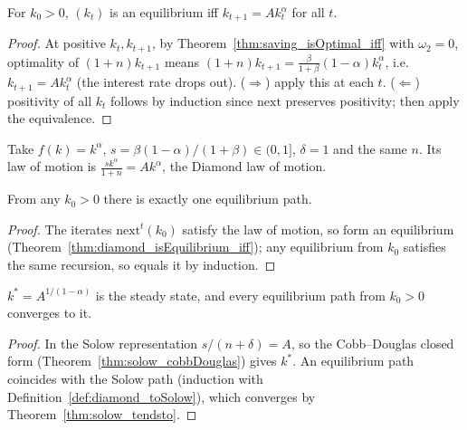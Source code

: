 \begin{theorem}
\label{thm:diamond_isEquilibrium_iff}
\leanok
{}
For $k_0 > 0$, $(k_t)$ is an equilibrium iff $k_{t+1} = A k_t^\alpha$ for all $t$.
\end{theorem}
\begin{proof}
\leanok
At positive $k_t, k_{t+1}$, by Theorem~\ref{thm:saving_isOptimal_iff} with $\omega_2 = 0$, optimality of
$(1+n)k_{t+1}$ means $(1+n)k_{t+1} = \frac{\beta}{1+\beta}(1-\alpha)k_t^\alpha$, i.e.\ $k_{t+1} = A k_t^\alpha$
(the interest rate drops out). ($\Rightarrow$) apply this at each $t$. ($\Leftarrow$) positivity of all $k_t$
follows by induction since $\mathrm{next}$ preserves positivity; then apply the equivalence.
\end{proof}

\begin{definition}
\label{def:diamond_toSolow}
\leanok
{}
Take $f(k) = k^\alpha$, $s = \beta(1-\alpha)/(1+\beta) \in (0, 1]$, $\delta = 1$ and the same $n$. Its law of
motion is $\frac{s k^\alpha}{1+n} = A k^\alpha$, the Diamond law of motion.
\end{definition}

\begin{theorem}
\label{thm:diamond_existsUnique}
\leanok
{}
From any $k_0 > 0$ there is exactly one equilibrium path.
\end{theorem}
\begin{proof}
\leanok
The iterates $\mathrm{next}^t(k_0)$ satisfy the law of motion, so form an equilibrium
(Theorem~\ref{thm:diamond_isEquilibrium_iff}); any equilibrium from $k_0$ satisfies the same recursion, so
equals it by induction.
\end{proof}

\begin{theorem}
\label{thm:diamond_tendsto}
\leanok
{}
$k^* = A^{1/(1-\alpha)}$ is the steady state, and every equilibrium path from $k_0 > 0$ converges to it.
\end{theorem}
\begin{proof}
\leanok
In the Solow representation $s/(n + \delta) = A$, so the Cobb--Douglas closed form
(Theorem~\ref{thm:solow_cobbDouglas}) gives $k^*$. An equilibrium path coincides with the Solow path (induction
with Definition~\ref{def:diamond_toSolow}), which converges by Theorem~\ref{thm:solow_tendsto}.
\end{proof}

